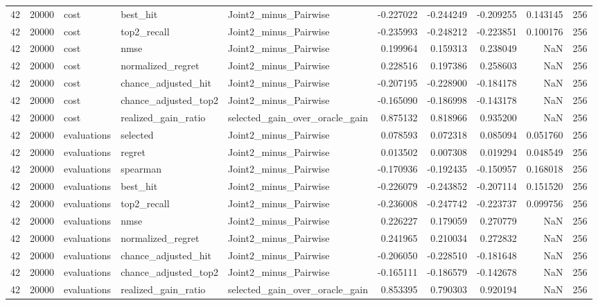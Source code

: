 \begin{tabular}{rrlllrrrrr}
42 & 20000 & cost & best_hit & Joint2_minus_Pairwise & -0.227022 & -0.244249 & -0.209255 & 0.143145 & 256 \\
42 & 20000 & cost & top2_recall & Joint2_minus_Pairwise & -0.235993 & -0.248212 & -0.223851 & 0.100176 & 256 \\
42 & 20000 & cost & nmse & Joint2_minus_Pairwise & 0.199964 & 0.159313 & 0.238049 & NaN & 256 \\
42 & 20000 & cost & normalized_regret & Joint2_minus_Pairwise & 0.228516 & 0.197386 & 0.258603 & NaN & 256 \\
42 & 20000 & cost & chance_adjusted_hit & Joint2_minus_Pairwise & -0.207195 & -0.228900 & -0.184178 & NaN & 256 \\
42 & 20000 & cost & chance_adjusted_top2 & Joint2_minus_Pairwise & -0.165090 & -0.186998 & -0.143178 & NaN & 256 \\
42 & 20000 & cost & realized_gain_ratio & selected_gain_over_oracle_gain & 0.875132 & 0.818966 & 0.935200 & NaN & 256 \\
42 & 20000 & evaluations & selected & Joint2_minus_Pairwise & 0.078593 & 0.072318 & 0.085094 & 0.051760 & 256 \\
42 & 20000 & evaluations & regret & Joint2_minus_Pairwise & 0.013502 & 0.007308 & 0.019294 & 0.048549 & 256 \\
42 & 20000 & evaluations & spearman & Joint2_minus_Pairwise & -0.170936 & -0.192435 & -0.150957 & 0.168018 & 256 \\
42 & 20000 & evaluations & best_hit & Joint2_minus_Pairwise & -0.226079 & -0.243852 & -0.207114 & 0.151520 & 256 \\
42 & 20000 & evaluations & top2_recall & Joint2_minus_Pairwise & -0.236008 & -0.247742 & -0.223737 & 0.099756 & 256 \\
42 & 20000 & evaluations & nmse & Joint2_minus_Pairwise & 0.226227 & 0.179059 & 0.270779 & NaN & 256 \\
42 & 20000 & evaluations & normalized_regret & Joint2_minus_Pairwise & 0.241965 & 0.210034 & 0.272832 & NaN & 256 \\
42 & 20000 & evaluations & chance_adjusted_hit & Joint2_minus_Pairwise & -0.206050 & -0.228510 & -0.181648 & NaN & 256 \\
42 & 20000 & evaluations & chance_adjusted_top2 & Joint2_minus_Pairwise & -0.165111 & -0.186579 & -0.142678 & NaN & 256 \\
42 & 20000 & evaluations & realized_gain_ratio & selected_gain_over_oracle_gain & 0.853395 & 0.790303 & 0.920194 & NaN & 256 \\

\end{tabular}
